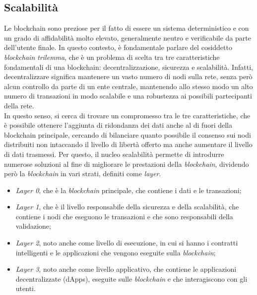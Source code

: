 \clearpage

\subsection{Scalabilità}\label{sec:tecnologie-blockchain-avanzate-scalabilita}
Le blockchain sono preziose per il fatto di essere un sistema deterministico e con un grado di affidabilità molto elevato, generalmente neutro e verificabile da parte dell'utente finale.
In questo contesto, è fondamentale parlare del cosiddetto \textit{blockchain trilemma}, che è un problema di scelta tra tre caratteristiche fondamentali di una blockchain: decentralizzazione, sicurezza e scalabilità.
Infatti, decentralizzare significa mantenere un vasto numero di nodi sulla rete, senza però alcun controllo da parte di un ente centrale, 
mantenendo allo stesso modo un alto numero di transazioni in modo scalabile e una robustezza ai possibili partecipanti della rete. \\

In questo senso, si cerca di trovare un compromesso tra le tre caratteristiche, che è possibile ottenere l'aggiunta di ridondanza dei dati anche al di fuori della blockchain principale,
cercando di bilanciare quanto possibile il consenso sui nodi distribuiti non intaccando il livello di libertà offerto ma anche aumentare il livello di dati trasmessi.
Per questo, il nucleo scalabilità permette di introdurre numerose soluzioni al fine di migliorare le prestazioni della \textit{blockchain}, dividendo però la \textit{blockchain} in vari strati, definiti come \textit{layer}.
\begin{itemize}
    \item{\textit{Layer 0}}, che è la \textit{blockchain} principale, che contiene i dati e le transazioni;
    \item{\textit{Layer 1}}, che è il livello responsabile della sicurezza e della scalabilità, che contiene i nodi che eseguono le transazioni e che sono responsabili della validazione;
    \item{\textit{Layer 2}}, noto anche come livello di esecuzione, in cui si hanno i contratti intelligenti e le applicazioni che vengono eseguite sulla \textit{blockchain};
    \item{\textit{Layer 3}}, noto anche come livello applicativo, che contiene le applicazioni decentralizzate (dApps), eseguite sulle \textit{blockchain} e che interagiscono con gli utenti.
\end{itemize}

